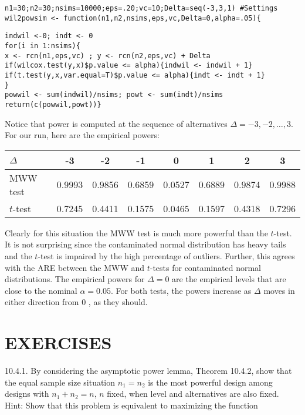 \begin{verbatim}
n1=30;n2=30;nsims=10000;eps=.20;vc=10;Delta=seq(-3,3,1) #Settings
wil2powsim <- function(n1,n2,nsims,eps,vc,Delta=0,alpha=.05){
\end{verbatim}

\begin{verbatim}
indwil <-0; indt <- 0
for(i in 1:nsims){
x <- rcn(n1,eps,vc) ; y <- rcn(n2,eps,vc) + Delta
if(wilcox.test(y,x)$p.value <= alpha){indwil <- indwil + 1}
if(t.test(y,x,var.equal=T)$p.value <= alpha){indt <- indt + 1}
}
powwil <- sum(indwil)/nsims; powt <- sum(indt)/nsims
return(c(powwil,powt))}
\end{verbatim}

Notice that power is computed at the sequence of alternatives $\Delta=-3,-2, \ldots, 3$. For our run, here are the empirical powers:

\begin{center}
\begin{tabular}{|l|c|c|c|c|c|c|c|}
\hline
$\Delta$ & -3 & -2 & -1 & 0 & 1 & 2 & 3 \\
\hline
MWW test & 0.9993 & 0.9856 & 0.6859 & 0.0527 & 0.6889 & 0.9874 & 0.9988 \\
\hline
$t$-test & 0.7245 & 0.4411 & 0.1575 & 0.0465 & 0.1597 & 0.4318 & 0.7296 \\
\hline
\end{tabular}
\end{center}

Clearly for this situation the MWW test is much more powerful than the $t$-test. It is not surprising since the contaminated normal distribution has heavy tails and the $t$-test is impaired by the high percentage of outliers. Further, this agrees with the ARE between the MWW and $t$-tests for contaminated normal distributions. The empirical powers for $\Delta=0$ are the empirical levels that are close to the nominal $\alpha=0.05$. For both tests, the powers increase as $\Delta$ moves in either direction from 0 , as they should.

\section*{EXERCISES}
10.4.1. By considering the asymptotic power lemma, Theorem 10.4.2, show that the equal sample size situation $n_{1}=n_{2}$ is the most powerful design among designs with $n_{1}+n_{2}=n$, $n$ fixed, when level and alternatives are also fixed.\\
Hint: Show that this problem is equivalent to maximizing the function


